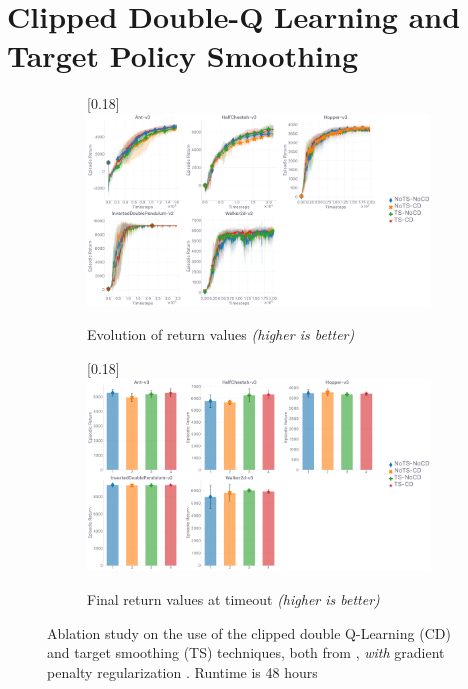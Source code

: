 \section{Clipped Double-Q Learning and Target Policy Smoothing}
\label{ablationtd3}

\begin{figure}[H]
  \center
  \begin{subfigure}[t]{0.99\textwidth}
    \center\scalebox{0.18}[0.18]{\includegraphics{Plots/fig13_td3_tricks_5envs/plots_eval_env_ret_plot.pdf}}
    \caption{Evolution of return values \textit{(higher is better)}}
  \end{subfigure}
  \begin{subfigure}[t]{0.99\textwidth}
    \center\scalebox{0.18}[0.18]{\includegraphics{Plots/fig13_td3_tricks_5envs/plots_eval_env_ret_barplot.pdf}}
    \caption{Final return values at timeout \textit{(higher is better)}}
  \end{subfigure}
  \caption{
  Ablation study on the use of the clipped double Q-Learning (CD)
  and target smoothing (TS) techniques,
  both from \cite{Fujimoto2018-pe},
  \emph{with} gradient penalty regularization \cite{Gulrajani2017-mr}.
  Runtime is 48 hours}
\end{figure}

